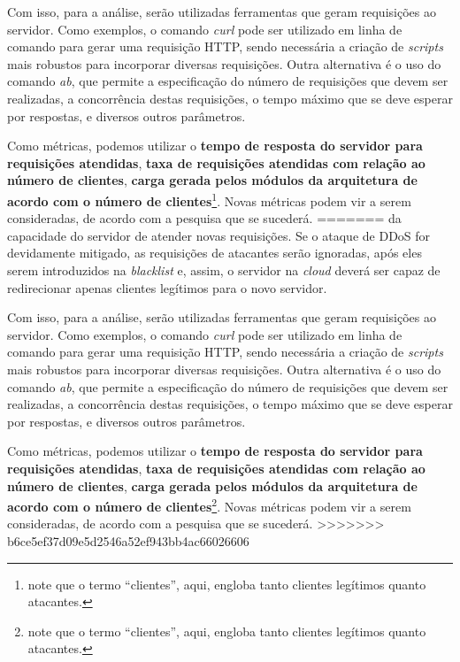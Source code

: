\documentclass[a4paper, 11pt]{article}
\begin{document}
Com isso, para a análise, serão utilizadas ferramentas que geram requisições ao
servidor. Como exemplos, o comando
\emph{curl} pode ser utilizado em linha de comando para gerar uma requisição
HTTP, sendo necessária a criação de \emph{scripts} mais robustos para incorporar
diversas requisições. Outra alternativa é o uso do comando \emph{ab}, que
permite a especificação do número de requisições que devem ser realizadas, a
concorrência destas requisições, o tempo máximo que se deve esperar por
respostas, e diversos outros parâmetros.

Como métricas, podemos utilizar o \textbf{tempo de resposta do servidor para
requisições atendidas}, \textbf{taxa de requisições atendidas com relação ao
número de clientes}, \textbf{carga gerada pelos módulos da arquitetura de acordo
com o número de clientes}\footnote{note que o termo ``clientes'', aqui, engloba
tanto clientes legítimos quanto atacantes.}. Novas métricas podem vir a serem
consideradas, de acordo com a pesquisa que se sucederá.
=======
da capacidade do servidor de atender novas requisições. Se o ataque de DDoS for devidamente
mitigado, as requisições de atacantes serão ignoradas, após eles serem introduzidos na \emph{blacklist}
e, assim, o servidor na \emph{cloud} deverá ser capaz de redirecionar apenas clientes legítimos 
para o novo servidor.

Com isso, para a análise, serão utilizadas ferramentas que geram requisições ao servidor. Como exemplos, o comando 
\emph{curl} pode ser utilizado em linha de comando para gerar uma requisição HTTP, sendo necessária a criação de \emph{scripts} mais robustos para incorporar diversas requisições. Outra alternativa é o uso do comando \emph{ab}, que permite a especificação do número de requisições que devem ser realizadas, a concorrência destas requisições, o tempo máximo que se deve esperar por respostas, e diversos outros parâmetros.

Como métricas, podemos utilizar o \textbf{tempo de resposta do servidor para requisições atendidas}, \textbf{taxa de requisições atendidas com relação ao número de clientes}, \textbf{carga gerada pelos módulos da arquitetura de acordo com o número de clientes}\footnote{note que o termo ``clientes'', aqui, engloba tanto clientes legítimos quanto atacantes.}. Novas métricas podem vir a serem consideradas, de acordo com a pesquisa que se sucederá.
>>>>>>> b6ce5ef37d09e5d2546a52ef943bb4ac66026606

\end{document}
